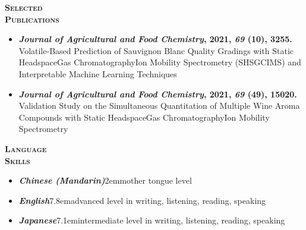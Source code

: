 \documentclass[11pt, a4paper, twoside]{article}
\begin{document}
\vspace{6ex}
\begin{minipage}[t]{0.15\textwidth}
\textsc{\textbf{\Large Selected\\Publications}}
  \end{minipage}\hfill
  \begin{minipage}[t]{0.8\textwidth}
    \begin{itemize}[leftmargin=*]
        \setlength\itemsep{-0.5ex}
        \item {\large\bf\textit{Journal of Agricultural and Food Chemistry}, \textbf{2021}, \textit{69}\kern2pt (10), 3255.}\\\vspace{-3pt}
        {\small Volatile-Based Prediction of Sauvignon Blanc Quality Gradings with Static Headspace\textendash Gas Chromatography\textendash Ion Mobility Spectrometry (SHS\textendash GC\textendash IMS) and Interpretable Machine Learning Techniques}
        \item {\large\bf\textit{Journal of Agricultural and Food Chemistry}, \textbf{2021}, \textit{69}\kern2pt (49), 15020.}\\\vspace{-3pt}
        {\small Validation Study on the Simultaneous Quantitation of Multiple Wine Aroma Compounds with Static Headspace\textendash Gas Chromatography\textendash Ion Mobility Spectrometry}
    \end{itemize}
\end{minipage}\par
\vspace{6ex}
\begin{minipage}[t]{0.15\textwidth}
\textsc{\textbf{\Large Language\\\vspace{2.5pt}Skills}}
  \end{minipage}\hfill
  \begin{minipage}[t]{0.8\textwidth}
    \begin{itemize}[leftmargin=*]
    \setlength\itemsep{-0.5ex}
    \item {\large \textbf{\itshape Chinese (Mandarin)}}\kern2em{\small mother tongue level}
   \item {\large \textbf{\itshape English}}\kern7.8em{\small advanced level in writing, listening, reading, speaking}
   \item {\large \textbf{\itshape Japanese}}\kern7.1em{\small intermediate level in writing, listening, reading, speaking}
   \end{itemize}
\end{minipage}\par
\end{document}

